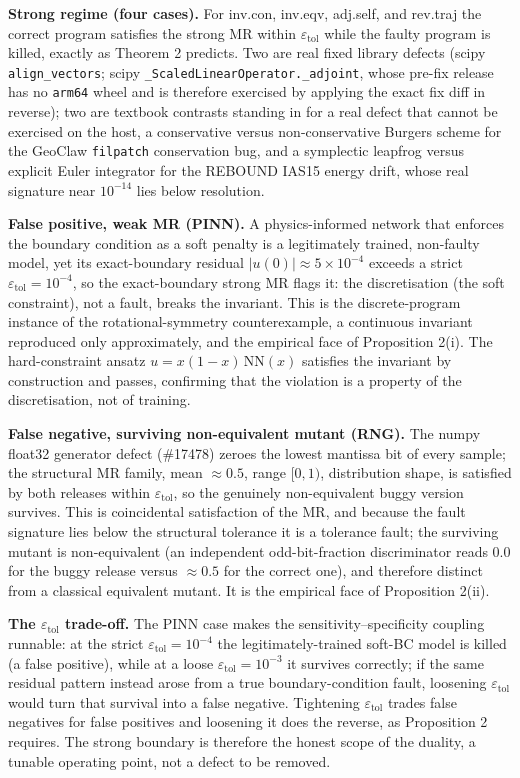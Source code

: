\documentclass[12pt]{article}
\begin{document}
\textbf{Strong regime (four cases).} For inv.con, inv.eqv, adj.self, and
rev.traj the correct program satisfies the strong MR within
$\varepsilon_{\mathrm{tol}}$ while the faulty program is killed, exactly
as Theorem 2 predicts. Two are real fixed library defects (scipy
\texttt{align\_vectors}; scipy \texttt{\_ScaledLinearOperator.\_adjoint},
whose pre-fix release has no \texttt{arm64} wheel and is therefore
exercised by applying the exact fix diff in reverse); two are textbook
contrasts standing in for a real defect that cannot be exercised on the
host, a conservative versus non-conservative Burgers scheme for the
GeoClaw \texttt{filpatch} conservation bug, and a symplectic leapfrog
versus explicit Euler integrator for the REBOUND IAS15 energy drift, whose
real signature near $10^{-14}$ lies below resolution.

\textbf{False positive, weak MR (PINN).} A physics-informed network
that enforces the boundary condition as a soft penalty is a legitimately
trained, non-faulty model, yet its exact-boundary residual
$|u(0)| \approx 5\times10^{-4}$ exceeds a strict
$\varepsilon_{\mathrm{tol}} = 10^{-4}$, so the exact-boundary strong MR
flags it: the discretisation (the soft constraint), not a fault, breaks
the invariant. This is the discrete-program instance of the
rotational-symmetry counterexample, a continuous invariant reproduced
only approximately, and the empirical face of Proposition 2(i). The
hard-constraint ansatz $u = x(1-x)\,\mathrm{NN}(x)$ satisfies the invariant
by construction and passes, confirming that the violation is a property of
the discretisation, not of training.

\textbf{False negative, surviving non-equivalent mutant (RNG).} The
numpy float32 generator defect (\#17478) zeroes the lowest mantissa bit of
every sample; the structural MR family, mean $\approx 0.5$, range
$[0,1)$, distribution shape, is satisfied by both releases within
$\varepsilon_{\mathrm{tol}}$, so the genuinely non-equivalent buggy version
survives. This is coincidental satisfaction of the MR, and because the
fault signature lies below the structural tolerance it is a tolerance
fault; the surviving mutant is non-equivalent (an independent
odd-bit-fraction discriminator reads $0.0$ for the buggy release versus
$\approx 0.5$ for the correct one), and therefore distinct from a
classical equivalent mutant. It is the empirical face of Proposition
2(ii).

\textbf{The $\varepsilon_{\mathrm{tol}}$ trade-off.} The PINN case makes
the sensitivity--specificity coupling runnable: at the strict
$\varepsilon_{\mathrm{tol}} = 10^{-4}$ the legitimately-trained soft-BC
model is killed (a false positive), while at a loose
$\varepsilon_{\mathrm{tol}} = 10^{-3}$ it survives correctly; if the same
residual pattern instead arose from a true boundary-condition fault,
loosening $\varepsilon_{\mathrm{tol}}$ would turn that survival into a
false negative. Tightening
$\varepsilon_{\mathrm{tol}}$ trades false negatives for false positives and
loosening it does the reverse, as Proposition 2 requires. The strong
boundary is therefore the honest scope of the duality, a tunable
operating point, not a defect to be removed.
\end{document}
